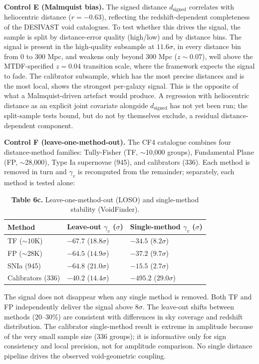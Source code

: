 \documentclass[11pt,a4paper]{article}
\begin{document}
\begin{mdframed}[linecolor=accent,linewidth=0.5pt,backgroundcolor=callout-bg,leftline=true,rightline=true,topline=true,bottomline=true,innerleftmargin=8pt,innerrightmargin=8pt,innertopmargin=6pt,innerbottommargin=6pt]
\textbf{Control E (Malmquist bias).} The signed distance \(d_\mathrm{signed}\) correlates with heliocentric distance (\(r = -0.63\)), reflecting the redshift-dependent completeness of the DESIVAST void catalogues. To test whether this drives the signal, the sample is split by distance-error quality (high/\allowbreak{}low) and by distance bins. The signal is present in the high-quality subsample at \(11.6\sigma\), in every distance bin from 0 to 300 Mpc, and weakens only beyond 300 Mpc (\(z \sim 0.07\)), well above the MTDF-specified \(z = 0.04\) transition scale, where the framework expects the signal to fade. The calibrator subsample, which has the most precise distances and is the most local, shows the strongest per-galaxy signal. This is the opposite of what a Malmquist-driven artefact would produce. A regression with heliocentric distance as an explicit joint covariate alongside \(d_\mathrm{signed}\) has not yet been run; the split-sample tests bound, but do not by themselves exclude, a residual distance-dependent component.

\textbf{Control F (leave-one-method-out).} The CF4 catalogue combines four distance-method families: Tully-Fisher (TF, \(\sim\)10,000 groups), Fundamental Plane (FP, \(\sim\)28,000), Type Ia supernovae (945), and calibrators (336). Each method is removed in turn and \(\gamma_v\) is recomputed from the remainder; separately, each method is tested alone:

\begin{table}[H]
\centering
\footnotesize
\caption{\textbf{Table 6c.} Leave-one-method-out (LOSO) and single-method stability (VoidFinder).}
\begin{tabularx}{\linewidth}{l>{\RaggedRight\arraybackslash}X>{\RaggedRight\arraybackslash}X}
\toprule
\textbf{Method} & \textbf{Leave-out \(\gamma_v\) (\(\sigma\))} & \textbf{Single-method \(\gamma_v\) (\(\sigma\))} \tabularnewline
\midrule
TF (\(\sim\)10K) & \(-67.7\) (\(18.8\sigma\)) & \(-34.5\) (\(8.2\sigma\)) \tabularnewline
FP (\(\sim\)28K) & \(-64.5\) (\(14.9\sigma\)) & \(-37.2\) (\(9.7\sigma\)) \tabularnewline
SNIa (945) & \(-64.8\) (\(21.0\sigma\)) & \(-15.5\) (\(2.7\sigma\)) \tabularnewline
Calibrators (336) & \(-40.2\) (\(14.4\sigma\)) & \(-495.2\) (\(29.0\sigma\)) \tabularnewline
\bottomrule
\end{tabularx}
\end{table}

The signal does not disappear when any single method is removed. Both TF and FP independently deliver the signal above \(8\sigma\). The leave-out shifts between methods (20--30\%) are consistent with differences in sky coverage and redshift distribution. The calibrator single-method result is extreme in amplitude because of the very small sample size (336 groups); it is informative only for sign consistency and local precision, not for amplitude comparison. No single distance pipeline drives the observed void-geometric coupling.
\end{mdframed}
\end{document}
